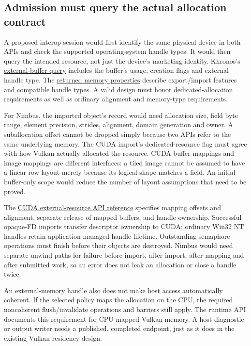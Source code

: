 \subsection{Admission must query the actual allocation contract}
A proposed interop session would first identify the same physical device in
both APIs and check the supported operating-system handle types. It would then
query the intended resource, not just the device's marketing identity.
Khronos's
\href{https://docs.vulkan.org/refpages/latest/refpages/source/VkPhysicalDeviceExternalBufferInfo.html}{external-buffer query}
includes the buffer's usage, creation flags and external handle type. The
\href{https://docs.vulkan.org/refpages/latest/refpages/source/VkExternalMemoryProperties.html}{returned memory properties}
describe export/import features and compatible handle types. A valid design
must honor dedicated-allocation requirements as well as ordinary alignment and
memory-type requirements.

For Nimbus, the imported object's record would need allocation size, field byte
range, element precision, strides, alignment, domain generation and owner. A
suballocation offset cannot be dropped simply because two APIs refer to the
same underlying memory. The CUDA import's dedicated-resource flag must agree
with how Vulkan actually allocated the resource. CUDA buffer mappings and
image mappings are different interfaces: a tiled image cannot be assumed to
have a linear row layout merely because its logical shape matches a field.
An initial buffer-only scope would reduce the number of layout assumptions
that need to be proved.

The
\href{https://docs.nvidia.com/cuda/cuda-runtime-api/cuda_runtime_api/group__CUDART__EXTRES__INTEROP.html}{CUDA external-resource API reference}
specifies mapping offsets and alignment, separate release of mapped buffers,
and handle ownership. Successful opaque-FD imports transfer descriptor ownership
to CUDA; ordinary Win32 NT handles retain application-managed handle lifetime.
Outstanding semaphore operations must finish before their objects are destroyed.
Nimbus would need separate unwind paths for failure before import, after import,
after mapping and after submitted work, so an error does not leak an allocation
or close a handle twice.

An external-memory handle also does not make host access automatically coherent.
If the selected policy maps the allocation on the CPU, the required noncoherent
flush/invalidate operations and barriers still apply. The runtime API documents
this requirement for CPU-mapped Vulkan memory. A host diagnostic or output
writer needs a published, completed endpoint, just as it does in the existing
Vulkan residency design.

